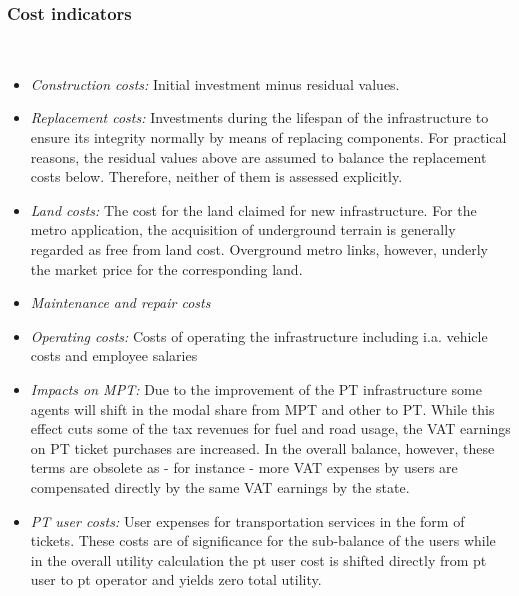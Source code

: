 \subsubsection{Cost indicators}\mbox{}\\[-5ex]
\begin{itemize}
	\item \textit{Construction costs:} Initial investment minus residual values.
	\item \textit{Replacement costs:} Investments during the lifespan of the infrastructure to ensure its integrity normally by means of replacing components. For practical reasons, the residual values above are assumed to balance the replacement costs below. Therefore, neither of them is assessed explicitly.
	\item \textit{Land costs:} The cost for the land claimed for new infrastructure. For the metro application, the acquisition of underground terrain is generally regarded as free from land cost. Overground metro links, however, underly the market price for the corresponding land.
	\item \textit{Maintenance and repair costs}
	\item \textit{Operating costs:} Costs of operating the infrastructure including i.a. vehicle costs and employee salaries
	\item \textit{Impacts on MPT:} Due to the improvement of the PT infrastructure some agents will shift in the modal share from MPT and other to PT. While this effect cuts some of the tax revenues for fuel and road usage, the VAT earnings on PT ticket purchases are increased. In the overall balance, however, these terms are obsolete as - for instance - more VAT expenses by users are compensated directly by the same VAT earnings by the state.
	\item \textit{PT user costs:} User expenses for transportation services in the form of tickets. These costs are of significance for the sub-balance of the users while in the overall utility calculation the pt user cost is shifted directly from pt user to pt operator and yields zero total utility.
	
\end{itemize}

